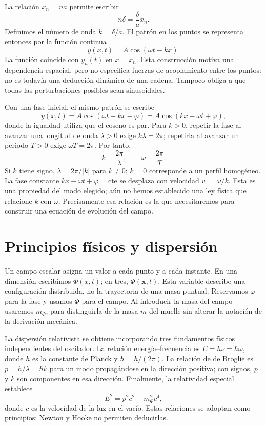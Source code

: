 La relación $x_n=na$ permite escribir
\[
n\delta=\frac\delta a x_n.
\]
Definimos el número de onda $k=\delta/a$. El patrón en los puntos se
representa entonces por la función continua
\begin{equation}
y(x,t)=A\cos(\omega t-kx).
\label{eq:onda-desfase}
\end{equation}
La función coincide con $y_n(t)$ en $x=x_n$. Esta construcción motiva
una dependencia espacial, pero no especifica fuerzas de acoplamiento
entre los puntos: no es todavía una deducción dinámica de una cadena.
Tampoco obliga a que todas las perturbaciones posibles sean sinusoidales.

Con una fase inicial, el mismo patrón se escribe
\[
y(x,t)=A\cos(\omega t-kx-\varphi)
=A\cos(kx-\omega t+\varphi),
\]
donde la igualdad utiliza que el coseno es par. Para $k>0$, repetir la fase
al avanzar una longitud de onda $\lambda>0$ exige $k\lambda=2\pi$; repetirla
al avanzar un periodo $T>0$ exige $\omega T=2\pi$. Por tanto,
\[
k=\frac{2\pi}{\lambda},\qquad \omega=\frac{2\pi}{T}.
\]
Si $k$ tiene signo, $\lambda=2\pi/|k|$ para $k\ne0$; $k=0$ corresponde a
un perfil homogéneo. La fase constante $kx-\omega t+\varphi=\mathrm{cte}$
se desplaza con velocidad $v_{\mathrm f}=\omega/k$. Esta es una propiedad
del modo elegido; aún no hemos establecido una ley física que relacione
$k$ con $\omega$. Precisamente esa relación es la que necesitaremos para
construir una ecuación de evolución del campo.

\section{Principios físicos y dispersión}

Un campo escalar asigna un valor a cada punto y a cada instante. En una
dimensión escribimos $\Phi(x,t)$; en tres, $\Phi(\boldsymbol{x},t)$.
Esta variable describe una configuración distribuida, no la trayectoria
de una masa puntual. Reservamos $\varphi$ para la fase y usamos $\Phi$
para el campo.
Al introducir la masa del campo usaremos $m_\Phi$, para distinguirla de
la masa $m$ del muelle sin alterar la notación de la derivación mecánica.

La dispersión relativista se obtiene incorporando tres fundamentos físicos
independientes del oscilador.
La relación energía--frecuencia es $E=h\nu=\hbar\omega$, donde $h$ es la
constante de Planck y $\hbar=h/(2\pi)$. La relación de de Broglie es
$p=h/\lambda=\hbar k$ para un modo propagándose en la dirección positiva;
con signos, $p$ y $k$ son componentes en esa dirección. Finalmente, la
relatividad especial establece
\[
E^2=p^2c^2+m_\Phi^2c^4,
\]
donde $c$ es la velocidad de la luz en el vacío. Estas relaciones se adoptan
como principios: Newton y Hooke no permiten deducirlas.

